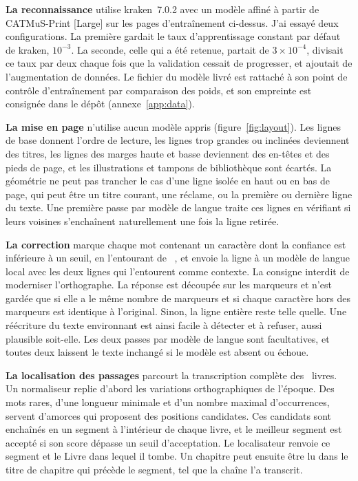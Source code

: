 \textbf{La reconnaissance} utilise kraken~7.0.2 \cite{kiessling2025kraken}
avec un modèle affiné à partir de CATMuS-Print [Large]
\cite{gabay2024catmusprintlarge} sur les pages d'entraînement ci-dessus. J'ai
essayé deux configurations. La première gardait le taux d'apprentissage
constant par défaut de kraken, $10^{-3}$. La seconde, celle qui a été retenue,
partait de $3\times10^{-4}$, divisait ce taux par deux chaque fois que la
validation cessait de progresser, et ajoutait de l'augmentation de données. Le
fichier du modèle livré est rattaché à son point de contrôle d'entraînement par
comparaison des poids, et son empreinte est consignée dans le dépôt
(annexe~\ref{app:data}).

\textbf{La mise en page} n'utilise aucun modèle appris
(figure~\ref{fig:layout}). Les lignes de base donnent l'ordre de lecture, les
lignes trop grandes ou inclinées deviennent des titres, les lignes des marges
haute et basse deviennent des en-têtes et des pieds de page, et les
illustrations et tampons de bibliothèque sont écartés. La géométrie ne peut pas
trancher le cas d'une ligne isolée en haut ou en bas de page, qui peut être un
titre courant, une réclame, ou la première ou dernière ligne du texte. Une
première passe par modèle de langue traite ces lignes en vérifiant si leurs
voisines s'enchaînent naturellement une fois la ligne retirée.

\textbf{La correction} marque chaque mot contenant un caractère dont la
confiance est inférieure à un seuil, en l'entourant de \lmark~\rmark{}, et
envoie la ligne à un modèle de langue local avec les deux lignes qui
l'entourent comme contexte. La consigne interdit de moderniser l'orthographe.
La réponse est découpée sur les marqueurs et n'est gardée que si elle a le même
nombre de marqueurs et si chaque caractère hors des marqueurs est identique à
l'original. Sinon, la ligne entière reste telle quelle. Une réécriture du texte
environnant est ainsi facile à détecter et à refuser, aussi plausible
soit-elle. Les deux passes par modèle de langue sont facultatives, et toutes
deux laissent le texte inchangé si le modèle est absent ou échoue.

\textbf{La localisation des passages} parcourt la transcription complète des
\ocrBooks{}~livres. Un normaliseur replie d'abord les variations
orthographiques de l'époque. Des mots rares, d'une longueur minimale et d'un
nombre maximal d'occurrences, servent d'amorces qui proposent des positions
candidates. Ces candidats sont enchaînés en un segment à l'intérieur de chaque
livre, et le meilleur segment est accepté si son score dépasse un seuil
d'acceptation. Le localisateur renvoie ce segment et le Livre dans lequel il
tombe. Un chapitre peut ensuite être lu dans le titre de chapitre qui précède
le segment, tel que la chaîne l'a transcrit.

